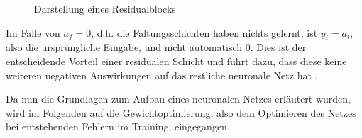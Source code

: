 \documentclass[12pt,a4paper,bibliography=totocnumbered,listof=totocnumbered]{article}
\begin{document}
\begin{figure}[h]
\centering
{}
\caption{Darstellung eines Residualblocks \citep[In Anlehnung an][S.223 f.]{Krohn.2020}}
\label{abb:resnet}
\end{figure}
Im Falle von $a_f=0$, d.h. die Faltungsschichten haben nichts gelernt, ist $y_i=a_i$, also die ursprüngliche Eingabe, und nicht automatisch 0. Dies ist der entscheidende Vorteil einer residualen Schicht und führt dazu, dass diese keine weiteren negativen Auswirkungen auf das restliche neuronale Netz hat \citep[S.222 f.]{Krohn.2020}.


Da nun die Grundlagen zum Aufbau eines neuronalen Netzes erläutert wurden, wird im Folgenden auf die Gewichtoptimierung, also dem Optimieren des Netzes bei entstehenden Fehlern im Training, eingegangen.
\end{document}
